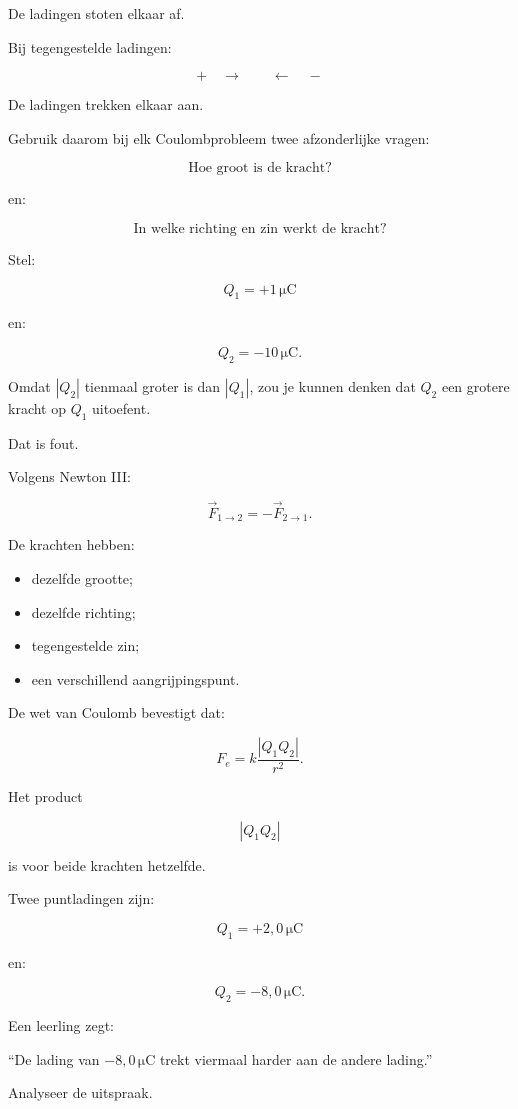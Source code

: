 \documentclass{ximera}
\begin{document}
De ladingen stoten elkaar af.


Bij tegengestelde ladingen:

\[
+\quad\longrightarrow
\qquad
\longleftarrow\quad-
\]

De ladingen trekken elkaar aan.


Gebruik daarom bij elk Coulombprobleem twee afzonderlijke vragen:

\[
\boxed{\text{Hoe groot is de kracht?}}
\]

en:

\[
\boxed{\text{In welke richting en zin werkt de kracht?}}
\]




Stel:

\[
Q_1=+1\,\mathrm{\mu C}
\]

en:

\[
Q_2=-10\,\mathrm{\mu C}.
\]

Omdat $|Q_2|$ tienmaal groter is dan $|Q_1|$, zou je kunnen denken dat
$Q_2$ een grotere kracht op $Q_1$ uitoefent.

Dat is fout.

Volgens Newton III:

\[
\boxed{
\vec F_{1\rightarrow2}
=
-\vec F_{2\rightarrow1}.
}
\]

De krachten hebben:

\begin{itemize}
  \item dezelfde grootte;
  \item dezelfde richting;
  \item tegengestelde zin;
  \item een verschillend aangrijpingspunt.
\end{itemize}


De wet van Coulomb bevestigt dat:

\[
F_e
=
k\frac{|Q_1Q_2|}{r^2}.
\]

Het product

\[
|Q_1Q_2|
\]

is voor beide krachten hetzelfde.


\begin{oefening}{\oefU\ESS}

Twee puntladingen zijn:

\[
Q_1=+2{,}0\,\mathrm{\mu C}
\]

en:

\[
Q_2=-8{,}0\,\mathrm{\mu C}.
\]

Een leerling zegt:

``De lading van $-8{,}0\,\mathrm{\mu C}$ trekt viermaal harder aan de
andere lading.''

Analyseer de uitspraak.

\end{oefening}
\end{document}
